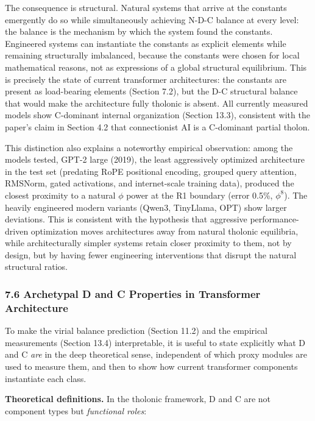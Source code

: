 \documentclass[
  11pt,
  letterpaper,
]{article}
\begin{document}
The consequence is structural. Natural systems that arrive at the
constants emergently do so while simultaneously achieving N-D-C balance
at every level: the balance is the mechanism by which the system found
the constants. Engineered systems can instantiate the constants as
explicit elements while remaining structurally imbalanced, because the
constants were chosen for local mathematical reasons, not as expressions
of a global structural equilibrium. This is precisely the state of
current transformer architectures: the constants are present as
load-bearing elements (Section 7.2), but the D-C structural balance that
would make the architecture fully tholonic is absent. All currently
measured models show C-dominant internal organization (Section 13.3),
consistent with the paper's claim in Section 4.2 that connectionist AI
is a C-dominant partial tholon.

This distinction also explains a noteworthy empirical observation: among
the models tested, GPT-2 large (2019), the least aggressively optimized
architecture in the test set (predating RoPE positional encoding,
grouped query attention, RMSNorm, gated activations, and internet-scale
training data), produced the closest proximity to a natural \(\phi\)
power at the R1 boundary (error 0.5\%, \(\phi^8\)). The heavily
engineered modern variants (Qwen3, TinyLlama, OPT) show larger
deviations. This is consistent with the hypothesis that aggressive
performance-driven optimization moves architectures away from natural
tholonic equilibria, while architecturally simpler systems retain closer
proximity to them, not by design, but by having fewer engineering
interventions that disrupt the natural structural ratios.

\subsubsection{7.6 Archetypal D and C Properties in Transformer
Architecture}\label{archetypal-d-and-c-properties-in-transformer-architecture}

To make the virial balance prediction (Section 11.2) and the empirical
measurements (Section 13.4) interpretable, it is useful to state
explicitly what D and C \emph{are} in the deep theoretical sense,
independent of which proxy modules are used to measure them, and then to
show how current transformer components instantiate each class.

\textbf{Theoretical definitions.} In the tholonic framework, D and C are
not component types but \emph{functional roles}:
\end{document}

